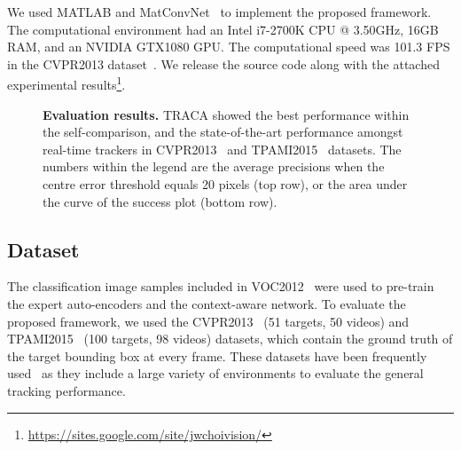 \documentclass[10pt,twocolumn,letterpaper]{article}
\begin{document}
We used MATLAB and MatConvNet~\cite{ref:matconvnet} to implement the proposed framework. 
The computational environment had an Intel i7-2700K CPU @ 3.50GHz, 16GB RAM, and an NVIDIA GTX1080 GPU. 
The computational speed was 101.3 FPS in the CVPR2013 dataset~\cite{ref:Benchmark}.
We release the source code along with the attached experimental results\footnote{\url{https://sites.google.com/site/jwchoivision/}}.

\begin{figure*}[t]
\centering
{}
\hfill
{}
\hfill
{}
\addtocounter{subfigure}{-3}
\vspace{-0.6cm}
\end{figure*}
\begin{figure*}[t]
\centering
{}
\hfill
{}
\hfill
{}
\caption{{\bf{Evaluation results.}} \ac{TRACA} showed the best performance within the self-comparison, and the state-of-the-art performance amongst real-time trackers in CVPR2013~\cite{ref:Benchmark} and TPAMI2015~\cite{ref:TPAMI2015Benchmark} datasets. The numbers within the legend are the average precisions when the centre error threshold equals 20 pixels (top row), or the area under the curve of the success plot (bottom row).}
    \label{fig:Evaluation}
    \vspace{-4mm}
\end{figure*}

\subsection{Dataset}
\label{subsec:dataset}
The classification image samples included in VOC2012~\cite{ref:voc2012} were used to pre-train the expert auto-encoders and the context-aware network.
To evaluate the proposed framework, we used the CVPR2013~\cite{ref:Benchmark} (51 targets, 50 videos) and TPAMI2015~\cite{ref:TPAMI2015Benchmark} (100 targets, 98 videos) datasets, which contain the ground truth of the target bounding box at every frame.
These datasets have been frequently used~\cite{ref:COT,ref:MDNet,ref:KCF,ref:MUSTer,ref:MEEM,ref:STRUCK,ref:ACFN} as they include a large variety of environments to evaluate the general tracking performance.
\end{document}
